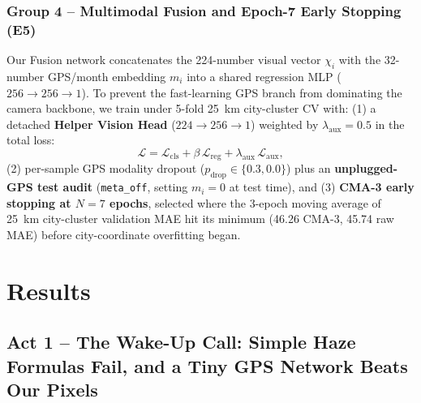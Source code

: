 \documentclass[conference]{IEEEtran}
\begin{document}
\subsubsection{Group 4 -- Multimodal Fusion and Epoch-7 Early Stopping (E5)}

Our Fusion network concatenates the 224-number visual vector $\chi_i$ with the
32-number GPS/month embedding $m_i$ into a shared regression MLP
($256 \to 256 \to 1$). To prevent the fast-learning GPS branch from dominating
the camera backbone, we train under 5-fold 25~km city-cluster CV with: (1) a
detached \textbf{Helper Vision Head} ($224 \to 256 \to 1$) weighted by
$\lambda_{\text{aux}} = 0.5$ in the total loss:
\begin{equation}
  \mathcal{L}
  = \mathcal{L}_{\text{cls}}
    + \beta\,\mathcal{L}_{\text{reg}}
    + \lambda_{\text{aux}}\,\mathcal{L}_{\text{aux}}, \label{eq:total_loss}
\end{equation}
(2) per-sample GPS modality dropout ($p_{\text{drop}} \in \{0.3, 0.0\}$) plus an
\textbf{unplugged-GPS test audit} (\texttt{meta\_off}, setting $m_i = 0$ at test
time), and (3) \textbf{CMA-3 early stopping at $N = 7$ epochs}, selected where
the 3-epoch moving average of 25~km city-cluster validation MAE hit its minimum
(46.26 CMA-3, 45.74 raw MAE) before city-coordinate overfitting began.

\section{Results}
\label{sec:results}

\subsection{
  Act 1 -- The Wake-Up Call: Simple Haze Formulas Fail, and a Tiny GPS Network
  Beats Our Pixels
}
\label{subsec:act1_baselines}
\end{document}
